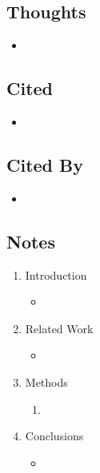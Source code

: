 \documentclass{article}
\begin{document}
\subsection*{Thoughts}
\begin{itemize}
	\item
\end{itemize}

\subsection*{Cited}
\begin{itemize}
	\item
\end{itemize}

\subsection*{Cited By}
\begin{itemize}
	\item
\end{itemize}

\subsection*{Notes}

\begin{enumerate}
	\item Introduction
	\begin{itemize}
		\item 
	\end{itemize}
	\item Related Work
	\begin{itemize}
		\item 
	\end{itemize}
	\item Methods
	\begin{enumerate}
		\item 
	\end{enumerate}
	\item Conclusions
	\begin{itemize}
		\item 
	\end{itemize}
\end{enumerate}

\pagebreak


\section*{}
\end{document}

